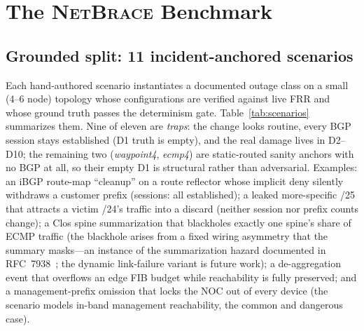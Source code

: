 \documentclass[11pt]{article}
\newcommand{\netbrace}{\textsc{NetBrace}}
\begin{document}
\section{The \netbrace{} Benchmark}
\label{sec:benchmark}

\subsection{Grounded split: 11 incident-anchored scenarios}
\label{sec:grounded}

Each hand-authored scenario instantiates a documented outage class on a
small (4--6 node) topology whose configurations are verified against live
FRR and whose ground truth passes the determinism gate.
Table~\ref{tab:scenarios} summarizes them. Nine of eleven are
\emph{traps}: the change looks routine, every BGP session stays established
(D1 truth is empty), and the real damage lives in D2--D10; the remaining
two (\emph{waypoint4}, \emph{ecmp4}) are static-routed sanity anchors with
no BGP at all, so their empty D1 is structural rather than adversarial.
Examples: an iBGP route-map ``cleanup'' on a route reflector whose implicit
deny silently withdraws a customer prefix (sessions: all established); a
leaked more-specific /25 that attracts a victim /24's traffic into a
discard (neither session nor prefix counts change); a Clos spine
summarization that blackholes exactly one spine's share of ECMP traffic
(the blackhole arises from a fixed wiring asymmetry that the summary
masks---an instance of the summarization hazard documented in
RFC~7938~\cite{rfc7938}; the dynamic link-failure variant is future work);
a de-aggregation event that overflows an edge FIB budget while reachability
is fully preserved; and a management-prefix omission that locks the NOC out
of every device (the scenario models in-band management reachability, the
common and dangerous case).
\end{document}
